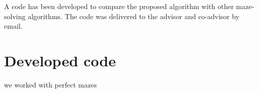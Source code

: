 \label{section_results}
A code has been developed to compare the proposed algorithm with other maze-solving algorithms. The code was delivered to the advisor and co-advisor by email.

\section{Developed code}

we worked with perfect mazes